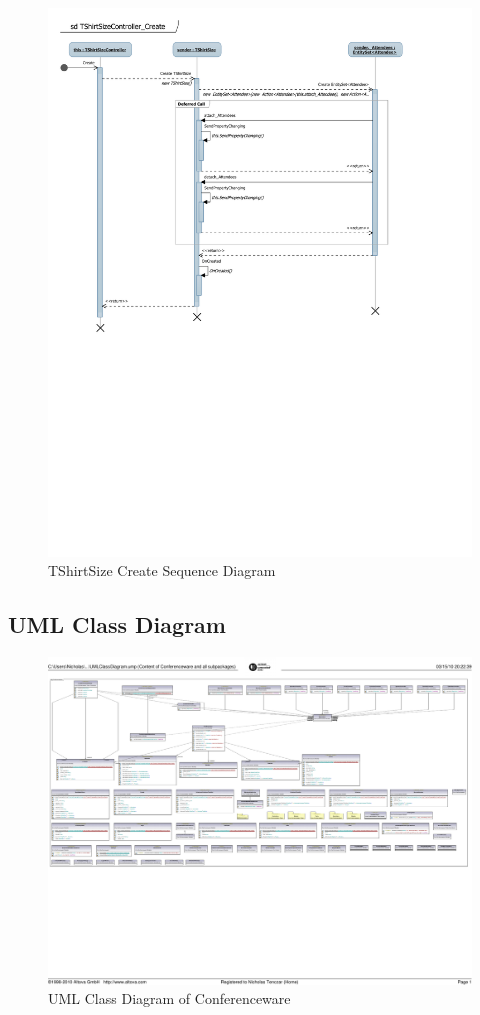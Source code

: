 \documentclass[12pt]{article}
\begin{document}
\begin{figure}[H]
\centering
\caption{TShirtSize Create Sequence Diagram}
\includegraphics[scale=0.8]{TShirtSizeCreate_sequence}
\end{figure}
\newpage
\subsection{UML Class Diagram}
\begin{figure}[H]
\centering
\caption{UML Class Diagram of Conferenceware}
\includegraphics[width=\textwidth]{UMLClassDiagram}
\end{figure}
\end{document}
